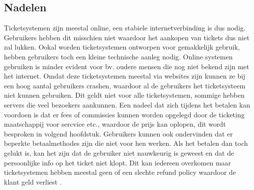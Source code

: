 \subsection{Nadelen}
Ticketsystemen zijn meestal online, een stabiele internetverbinding is dus nodig. Gebruikers hebben dit misschien niet waardoor het aankopen van tickets dus niet zal lukken. 
Ookal worden ticketsystemen ontworpen voor gemakkelijk gebruik, hebben gebruikers toch een kleine technische aanleg nodig. Online systemen gebruiken is minder evident voor bv. oudere mensen die nog niet bekend zijn met het internet.
Omdat deze ticketsystemen meestal via websites zijn kunnen ze bij een hoog aantal gebruikers crashen, waardoor al de gebruikers het ticketsysteem niet kunnen gebruiken. Dit geldt niet voor alle ticketsystemen, sommige hebben servers die veel bezoekers aankunnen.
Een nadeel dat zich tijdens het betalen kan voordoen is dat er fees of commissies kunnen worden opgelegd door de ticketing maatschappij voor sercvice etc., waardoor de prijs kan oplopen, dit wordt besproken in volgend hoofdstuk.
Gebruikers kunnen ook ondervinden dat er beperkte betaalmethodes zijn die niet voor hen werken. Als het betalen dan toch gelukt is, kan het zijn dat de gebruiker niet nauwkeurig is geweest en dat de persoonlijke info op het ticket niet klopt.
Dit kan iedereen overkomen maar ticketsystemen hebben meestal geen of een slechte refund policy waardoor de klant geld verliest \cite{concert-tickets-online2021}. 

